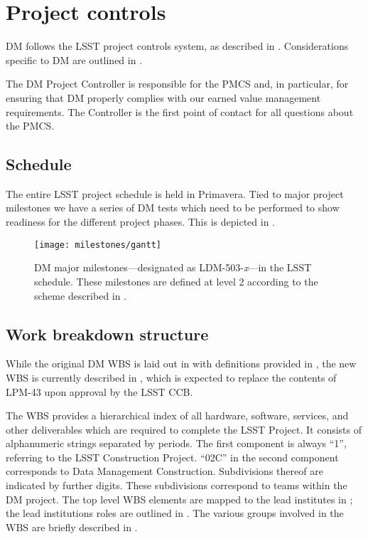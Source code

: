 \newpage
\section{Project controls}\label{sect:dmpc}

DM follows the LSST project controls system, as described in .
Considerations specific to DM are outlined in .

The DM Project Controller is responsible for the PMCS and, in particular, for ensuring that DM properly complies with our earned value management requirements.
The Controller is the first point of contact for all questions about the PMCS.

\subsection{Schedule}\label{sect:schedule}

The entire LSST project schedule is held in Primavera.
Tied to major project milestones we have a series of DM tests which need to be performed to show readiness for the different project phases.
This is depicted in .

\begin{figure}[htbp]
	\begin{center}
		 \texttt{[image: milestones/gantt]}
		 \caption{DM major milestones---designated as LDM-503-\textit{x}---in
         the LSST schedule. These milestones are defined at level 2 according
         to the scheme described in .}
         \label{fig:schedule}
	 \end{center}
 \end{figure}

\subsection{Work breakdown structure}\label{sect:WBS}

While the original DM WBS is laid out in  with definitions provided in ,
the new WBS is currently described in , which is expected to replace the contents of LPM-43 upon approval by the LSST CCB.

The WBS provides a hierarchical index of all hardware, software, services, and other deliverables which are required to complete the LSST Project.
It consists of alphanumeric strings separated by periods.
The first component is always “1”, referring to the LSST Construction Project.
``02C'' in the second component corresponds to Data Management Construction.
Subdivisions thereof are indicated by further digits.
These subdivisions correspond to teams within the DM project.
The top level WBS elements are mapped to the lead institutes in ; the lead institutions roles are outlined in .
The various groups involved in the WBS are briefly described in .

